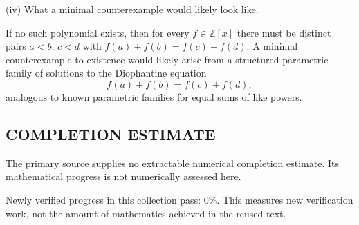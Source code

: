 (iv) What a minimal counterexample would likely look like.

If no such polynomial exists, then for every $f\in\mathbb Z[x]$ there must be distinct pairs $a<b$, $c<d$ with $f(a)+f(b)=f(c)+f(d)$.
A minimal counterexample to existence would likely arise from a structured parametric family of solutions to the Diophantine equation
\[f(a)+f(b)=f(c)+f(d),\]
analogous to known parametric families for equal sums of like powers.




\subsection*{COMPLETION ESTIMATE}
The primary source supplies no extractable numerical completion estimate. Its mathematical progress is not numerically assessed here.

Newly verified progress in this collection pass: $0\%$. This measures new verification work, not the amount of mathematics achieved in the reused text.
